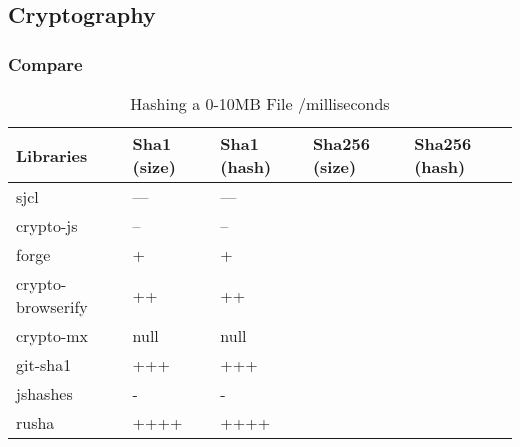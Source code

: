 
\subsection{Cryptography}

\subsubsection{Compare}

\begin{table}[!h]
\centering
\caption{Hashing a 0-10MB File /milliseconds}
\label{hashing-0-10mb-file}
\begin{adjustbox}{center, width=\columnwidth-20pt}
\begin{tabular}{|l|l|l|l|l|}
\hline
Libraries & Sha1 (size) & Sha1 (hash) & Sha256 (size) & Sha256 (hash) \\ \hline
sjcl				& ---	& ---	&	&	\\ \hline
crypto-js			& --	& --	&	&	\\ \hline
forge				& +		& +		&	&	\\ \hline
crypto-browserify	& ++	& ++	&	&	\\ \hline
crypto-mx           & null	& null	&	&	\\ \hline
git-sha1            & +++	& +++	&	&	\\ \hline
jshashes            & -		& -		&	&	\\ \hline
rusha               & ++++	& ++++	&	&	\\ \hline
\end{tabular}
\end{adjustbox}
\end{table}

